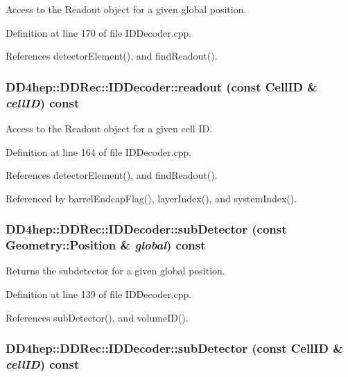 Access to the Readout object for a given global position. 

Definition at line 170 of file IDDecoder.cpp.

References detectorElement(), and findReadout().\hypertarget{class_d_d4hep_1_1_d_d_rec_1_1_i_d_decoder_ad0051c41f1ab387fb18167d9b04af228}{
\subsubsection[{readout}]{ DD4hep::DDRec::IDDecoder::readout (const {\bf CellID} \& {\em cellID}) const}}
\label{class_d_d4hep_1_1_d_d_rec_1_1_i_d_decoder_ad0051c41f1ab387fb18167d9b04af228}


Access to the Readout object for a given cell ID. 

Definition at line 164 of file IDDecoder.cpp.

References detectorElement(), and findReadout().

Referenced by barrelEndcapFlag(), layerIndex(), and systemIndex().\hypertarget{class_d_d4hep_1_1_d_d_rec_1_1_i_d_decoder_a1466e9c412d282849869517a4ac1de3f}{
\subsubsection[{subDetector}]{ DD4hep::DDRec::IDDecoder::subDetector (const {\bf Geometry::Position} \& {\em global}) const}}
\label{class_d_d4hep_1_1_d_d_rec_1_1_i_d_decoder_a1466e9c412d282849869517a4ac1de3f}


Returns the subdetector for a given global position. 

Definition at line 139 of file IDDecoder.cpp.

References subDetector(), and volumeID().\hypertarget{class_d_d4hep_1_1_d_d_rec_1_1_i_d_decoder_ab2f95282ac90f29e3ac70d6fc7d467be}{
\subsubsection[{subDetector}]{ DD4hep::DDRec::IDDecoder::subDetector (const {\bf CellID} \& {\em cellID}) const}}
\label{class_d_d4hep_1_1_d_d_rec_1_1_i_d_decoder_ab2f95282ac90f29e3ac70d6fc7d467be}


